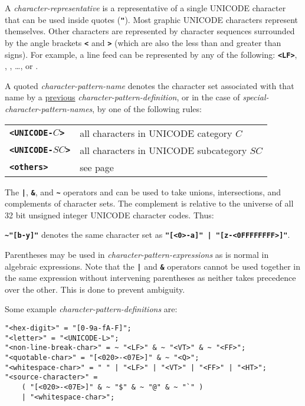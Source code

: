 \documentclass[12pt]{article}
\newcommand{\TT}[1]{{\tt \bfseries #1}}
\newenvironment{indpar}[1][0.3in]%
	{\begin{list}{}%
		     {\setlength{\itemsep}{0in}%
		      \setlength{\topsep}{0in}%
		      \setlength{\parsep}{1ex}%
		      \setlength{\labelwidth}{#1}%
		      \setlength{\leftmargin}{#1}%
		      \addtolength{\leftmargin}{\labelsep}}%
	 \item}%
	{\end{list}}
\begin{document}
A {\em character-representative} is a representative of a single UNICODE
character that can be used inside quotes (\TT{"}).
Most graphic UNICODE characters represent themselves.  Other characters
are represented by character sequences surrounded by the angle
brackets \TT{<} and \TT{>} (which are also the less than and
greater than signs).
For example, a line feed can be represented by any of the
following: \TT{<LF>}, \TT{<0A>},
\TT{<00A>}, \ldots, or \TT{<00000000A>}.

A quoted {\em character-pattern-name} denotes the character set associated
with that name by a \underline{previous} {\em character-pattern-definition},
or in the case of {\em special-character-pattern-names}, by one of the
following rules:
\begin{center}
\begin{tabular}{ll}
\TT{<UNICODE-$C$>} & all characters in UNICODE category $C$ \\
\TT{<UNICODE-$SC$>} & all characters in UNICODE subcategory $SC$ \\
\TT{<others>} & see page \pageref{<OTHERS>} \\
\end{tabular}
\end{center}

The \TT{|}, \TT{\&}, and \TT{\textasciitilde} operators and can be used to take
unions, intersections, and complements of character sets.  The complement
is relative to the universe of all 32 bit unsigned integer UNICODE
character codes.  Thus: \\
\centerline{\TT{\textasciitilde "[b-y]"}
denotes the same character set as
\TT{"[<0>-a]"\,|\,"[z-<0FFFFFFFF>]"}.}

Parentheses may be used in {\em character-pattern-expressions} as is
normal in algebraic expressions.
Note that the \TT{|} and \TT{\&} operators cannot be used together
in the same expression without intervening parentheses as neither
takes precedence over the other.  This is done to prevent ambiguity.

Some example {\em character-pattern-definitions} are:

\begin{indpar}[0.05in]\begin{verbatim}
"<hex-digit>" = "[0-9a-fA-F]";
"<letter>" = "<UNICODE-L>";
"<non-line-break-char>" = ~ "<LF>" & ~ "<VT>" & ~ "<FF>";
"<quotable-char>" = "[<020>-<07E>]" & ~ "<Q>";
"<whitespace-char>" = " " | "<LF>" | "<VT>" | "<FF>" | "<HT>";
"<source-character>" =
    ( "[<020>-<07E>]" & ~ "$" & ~ "@" & ~ "`" )
    | "<whitespace-char>";
\end{verbatim}\end{indpar}
\end{document}
